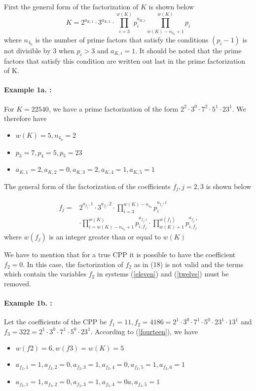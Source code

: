 \documentclass[fontsize=12pt]{article}
\newcommand{\cd}{\cdot}
\begin{document}
First the general form of the factorization of $K$ is shown below
\begin{equation}
 K =2^{a_{K,1}}\cdot 3^{a_{K,2}}\cdot \prod^{w(K)}_{i=3}p_i^{a_{K,i}}
 \prod^{w(K)}_{w(K)-n_{4_a}+1}p_i
\end{equation}
where $n_{4_a}$ is the number of prime factors that satisfy the conditions $(p_i-1)$ is not divisible by $3$ when $p_i>3$ and $a_{K,i}=1$. It should be noted that the prime factors that satisfy this condition are written out last in the prime factorization of K. 

\paragraph{Example 1a. : }
For $K=22540$, we have a prime factorization of the form $2^2\cd 3^0\cd 7^2\cd 5^1 \cd 23^1$. We therefore have 
\begin{itemize}\item$w(K)=5, n_{4_a}=2$
\item  $p_3=7, p_4 = 5, p_5=23$
\item $a_{K,1}=2, a_{K,2}=0, a_{K,3}=2,a_{K,4}=1, a_{K,5}=1$
\end{itemize}

The general form of the  factorization of the coefficients $f_j, j=2,3$ is shown below

\begin{equation}
\begin{split}
f_j= &2^{a_{f_j},1}\cd 3^{a_{f_j},2}\cd \prod^{w(K)-n_{4_a}}_{i=3} p_i^{a_{f_j},i}\\
&\cd \prod^{w(K)}_{i=w(K)-n_{4_a}+1} p_{i,f_j}^{a_{f_j,i}} \cd \prod_{w(K)+1}^{w(f_j)} p_{i,f_j}^{a_{f_j,i}}
\end{split}
\label{fourteen}
\end{equation}
where $w(f_j)$ is an integer greater than or equal to $w(K)$

We have to mention that for a true
CPP it is possible to have the coefficient $f_2 = 0$. In this case, the
factorization of $f_2$ as in (18) is not valid and the terms
which contain the variables $f_2$ in systems (\ref{eleven}) and (\ref{twelve}) must
be removed.

\paragraph{Example 1b. : }
Let the coefficients of the CPP be $f_1=11, f_2 = 4186 =
2^1 \cd 3^0 \cd 7^1 \cd 5^0 \cd 23^1 \cd 13^1$ and $ f_3 = 322 = 2^1 \cd 3^0 \cd 7^1 \cd
5^0 \cd 23^1$. According to (\ref{fourteen}),
we have 
\begin{itemize}
\item$w( f2) = 6, w(f3) = w(K) = 5$
\item $ a_{f_2,1} = 1, a_{f_2,2} = 0, a_{f_2,3} = 1, a_{ f_2,4} = 0, a_{f_2,5} = 1, a_{f_2,6} = 1$
\item$a_{f_3,1} = 1, a_{f_3,2} = 0, a_{f_3,3} = 1, a_{f_3,4} = 0 a, a_{f_3,5} = 1$
\end{itemize}
\end{document}
